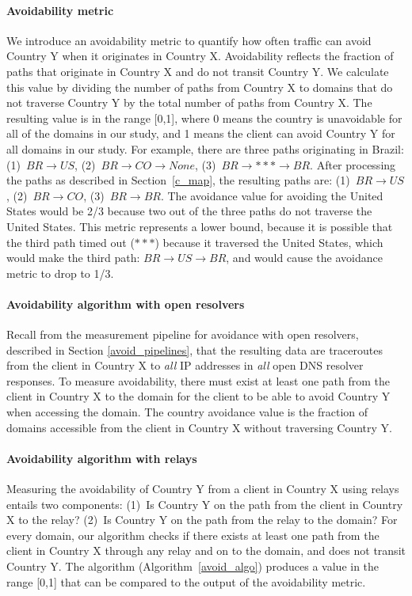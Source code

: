 \paragraph{Avoidability metric}  We introduce an avoidability metric to
quantify how often
traffic can avoid Country Y when it originates in Country X.
Avoidability reflects the fraction of paths that originate in Country
X and do not transit Country Y.  We calculate this value by dividing the
number of paths from Country X to domains that do not traverse Country Y
by the total number of paths from Country X. The resulting value is
in the range [0,1], where 0 means the country is unavoidable for all of
the domains in our study, and 1 means the client can avoid Country Y for
all domains in our study.  For example, there are three paths
originating in Brazil: (1)~$BR \rightarrow US$, (2)~$BR \rightarrow CO
\rightarrow None$, (3)~$BR \rightarrow *** \rightarrow BR$.  After
processing the paths as described in Section~\ref{c_map}, the resulting
paths are: (1)~$BR \rightarrow US$, (2)~$BR \rightarrow CO$, (3)~$BR
\rightarrow BR$.  The avoidance value for avoiding the United States
would be 2/3 because two out of the three paths do not traverse the
United States.  This metric represents a lower bound,
because it is possible that the third path timed out ($***$) because it
traversed the United States, which would make the third path: $BR
\rightarrow US \rightarrow BR$, and would cause the avoidance metric to
drop to 1/3.

\paragraph{Avoidability algorithm with open resolvers} Recall from the measurement pipeline for avoidance with open resolvers, described in Section \ref{avoid_pipelines}, that the resulting data are traceroutes from the client in Country X to \textit{all} IP addresses in \textit{all} open DNS resolver responses.  To measure avoidability, there must exist at least one path from the client in Country X to the domain for the client to be able to avoid Country Y when accessing the domain.  The country avoidance value is the fraction of domains accessible from the client in Country X without traversing Country Y.

\paragraph{Avoidability algorithm with relays}  Measuring the avoidability of Country Y
from a client in Country X using relays entails two components: (1)~Is Country Y
on the path from the client in Country X to the relay?  (2)~Is Country Y on
the path from the relay to the domain?  For every domain, our algorithm checks
if there exists at least one path from the client in Country X through any
relay and on to the domain, and does not transit Country Y.   The algorithm
(Algorithm~\ref{avoid_algo}) produces a value in the range [0,1] that can be
compared to the output of the avoidability metric.

